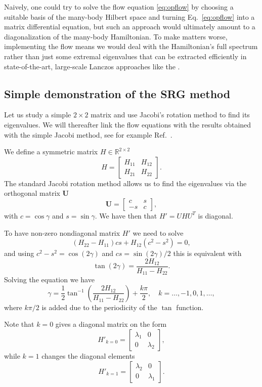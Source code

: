 Naively, one could try to solve the flow equation \eqref{eq:opflow} by
choosing a suitable basis of the many-body Hilbert space and turning
Eq.~\eqref{eq:opflow} into a matrix differential equation, but such an
approach would ultimately amount to a diagonalization of the many-body
Hamiltonian. To make matters worse, implementing the flow means we
would deal with the Hamiltonian's full spectrum rather than just some
extremal eigenvalues that can be extracted efficiently in
state-of-the-art, large-scale Lanczos approaches like the 
\cite{navratil2000,barrett2013}.

\subsection{Simple demonstration of the SRG method}
Let us study a simple $2\times 2$ matrix and use Jacobi's rotation method \cite{golubvanloan1996} to find its eigenvalues. 
We will thereafter link the flow equations
with the results obtained with the simple Jacobi method, see for example Ref.~\cite{golubvanloan1996}.

We define a  symmetric matrix  $H\in {\mathbb{R}}^{2\times 2}$
\[ 
H = \begin{bmatrix} H_{11} & H_{12} \\ H_{21} & H_{22}\end{bmatrix}. 
\]
The standard Jacobi rotation method allows us to find the eigenvalues via the orthogonal matrix
$\mathbf{U}$ 
\[ 
\mathbf{U} = \begin{bmatrix} c & s \\ -s & c
\end{bmatrix}, 
\]
with $c = \cos \gamma$ and $s = \sin \gamma$. We have then that  $H' = UHU^T$ is diagonal. 

To have non-zero nondiagonal matrix $H'$ we need to solve
\[ 
(H_{22} - H_{11})cs + H_{12}(c^2 - s^2) = 0, 
\]
and using $c^2-s^2 = \cos(2\gamma)$ and $cs = \sin(2\gamma)/2$
this is equivalent with 
\[ \tan(2\gamma) = \frac{2 H_{12}}{H_{11}-H_{22}}. \]
Solving the equation we have
\begin{equation} 
\gamma = \frac{1}{2} \tan^{-1} \left( \frac{2H_{12}}{H_{11}-H_{22}}
\right) + \frac{k\pi}{2}, \quad k=\ldots,-1,0,1,\ldots, \label{eq:0} 
\end{equation}
where $k\pi/2$ is added due to the periodicity of the $\tan$ function.

Note that  $k=0$ gives a diagonal matrix on the form
\begin{equation} 
H'_{k=0} = \begin{bmatrix} \lambda_1 & 0 \\ 0 & \lambda_2 \end{bmatrix},
\label{eq:1} 
\end{equation}
while  $k=1$ changes the diagonal elements  
\begin{equation} 
H'_{k=1} = \begin{bmatrix} \lambda_2 & 0 \\ 0 & \lambda_1 \end{bmatrix}.
\label{eq:2}
\end{equation}

